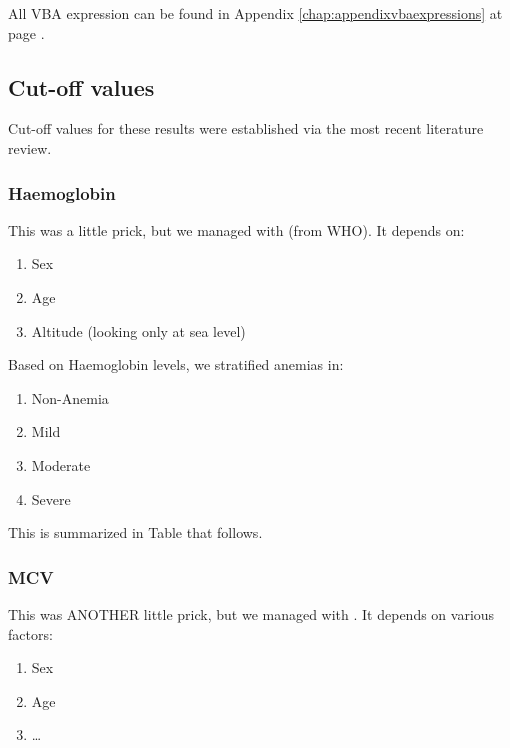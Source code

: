 All VBA expression can be found in Appendix \ref{chap:appendixvbaexpressions} at page \pageref{chap:appendixvbaexpressions}.

\subsection{Cut-off values}\label{sub:cutoffvalues}
Cut-off values for these results were established via the most recent literature review.


\subsubsection{Haemoglobin}\label{sub:haemoglobin}
This was a little prick, but we managed with \cite{Hbcutoff} (from WHO).
It depends on:
\begin{enumerate}
	\item Sex
	\item Age
	\item Altitude (looking only at sea level)
\end{enumerate}
Based on Haemoglobin levels, we stratified anemias in:
\begin{enumerate}
	\item Non-Anemia
	\item Mild
	\item Moderate
	\item Severe
\end{enumerate}
This is summarized in Table that follows.


\subsubsection{MCV}\label{sub:mcv}
This was ANOTHER little prick, but we managed with \cite{MCVferritincutoff}. It depends on various factors:

\begin{enumerate}
	\item Sex
	\item Age
	\item \dots
\end{enumerate}


